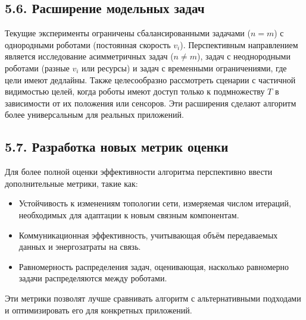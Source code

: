 \subsection*{5.6. Расширение модельных задач}
Текущие эксперименты ограничены сбалансированными задачами ($n = m$) с однородными роботами (постоянная скорость $v_i$). Перспективным направлением является исследование асимметричных задач ($n \neq m$), задач с неоднородными роботами (разные $v_i$ или ресурсы) и задач с временными ограничениями, где цели имеют дедлайны. Также целесообразно рассмотреть сценарии с частичной видимостью целей, когда роботы имеют доступ только к подмножеству $T$ в зависимости от их положения или сенсоров. Эти расширения сделают алгоритм более универсальным для реальных приложений.

\subsection*{5.7. Разработка новых метрик оценки}
Для более полной оценки эффективности алгоритма перспективно ввести дополнительные метрики, такие как:
\begin{itemize}
    \item Устойчивость к изменениям топологии сети, измеряемая числом итераций, необходимых для адаптации к новым связным компонентам.
    \item Коммуникационная эффективность, учитывающая объём передаваемых данных и энергозатраты на связь.
    \item Равномерность распределения задач, оценивающая, насколько равномерно задачи распределяются между роботами.
\end{itemize}
Эти метрики позволят лучше сравнивать алгоритм с альтернативными подходами и оптимизировать его для конкретных приложений.

